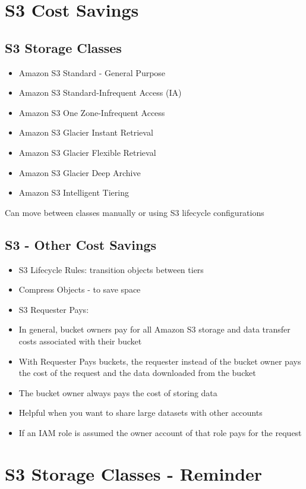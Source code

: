 \section{S3 Cost Savings}

\subsection{S3 Storage Classes}
\begin{itemize}
    \item Amazon S3 Standard - General Purpose
    \item Amazon S3 Standard-Infrequent Access (IA)
    \item Amazon S3 One Zone-Infrequent Access
    \item Amazon S3 Glacier Instant Retrieval
    \item Amazon S3 Glacier Flexible Retrieval
    \item Amazon S3 Glacier Deep Archive
    \item Amazon S3 Intelligent Tiering
\end{itemize}

Can move between classes manually or using S3 lifecycle configurations

\subsection{S3 - Other Cost Savings}
\begin{itemize}
    \item S3 Lifecycle Rules: transition objects between tiers
    \item Compress Objects - to save space
    \item S3 Requester Pays:
    \item In general, bucket owners pay for all Amazon S3 storage and data transfer costs associated with their bucket
    \item With Requester Pays buckets, the requester instead of the bucket owner pays the cost of the request and the data downloaded from the bucket
    \item The bucket owner always pays the cost of storing data
    \item Helpful when you want to share large datasets with other accounts
    \item If an IAM role is assumed the owner account of that role pays for the request
\end{itemize}


\section{S3 Storage Classes - Reminder}

